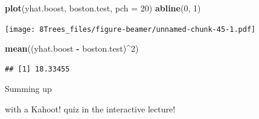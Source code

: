 \documentclass[10pt,ignorenonframetext,]{beamer}
\newenvironment{Shaded}{\begin{snugshade}}{\end{snugshade}}
\newcommand{\KeywordTok}[1]{\textcolor[rgb]{0.13,0.29,0.53}{\textbf{#1}}}
\newcommand{\DataTypeTok}[1]{\textcolor[rgb]{0.13,0.29,0.53}{#1}}
\newcommand{\DecValTok}[1]{\textcolor[rgb]{0.00,0.00,0.81}{#1}}
\newcommand{\StringTok}[1]{\textcolor[rgb]{0.31,0.60,0.02}{#1}}
\newcommand{\OperatorTok}[1]{\textcolor[rgb]{0.81,0.36,0.00}{\textbf{#1}}}
\newcommand{\NormalTok}[1]{#1}
\begin{document}
\begin{frame}[fragile]

\begin{Shaded}
\begin{Highlighting}[]
\KeywordTok{plot}\NormalTok{(yhat.boost, boston.test, }\DataTypeTok{pch =} \DecValTok{20}\NormalTok{)}
\KeywordTok{abline}\NormalTok{(}\DecValTok{0}\NormalTok{, }\DecValTok{1}\NormalTok{)}
\end{Highlighting}
\end{Shaded}

\texttt{[image: 8Trees\_files/figure-beamer/unnamed-chunk-45-1.pdf]}

\begin{Shaded}
\begin{Highlighting}[]
\KeywordTok{mean}\NormalTok{((yhat.boost }\OperatorTok{-}\StringTok{ }\NormalTok{boston.test)}\OperatorTok{^}\DecValTok{2}\NormalTok{)}
\end{Highlighting}
\end{Shaded}

\begin{verbatim}
## [1] 18.33455
\end{verbatim}

\end{frame}

\begin{frame}{Summing up }

with a Kahoot! quiz in the interactive lecture!

\end{frame}
\end{document}
